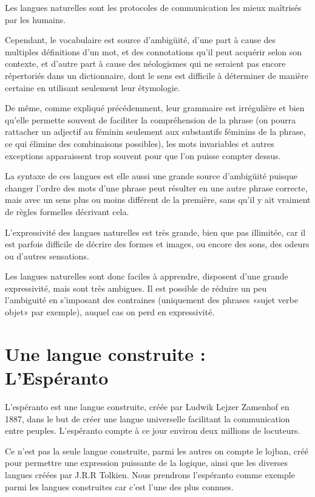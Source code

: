 \documentclass[french,a4paper]{article}
\begin{document}
Les langues naturelles sont les protocoles de communication les mieux
maîtrisés par les humains.

Cependant, le vocabulaire est source d'ambigüité, d'une part à cause
des multiples définitions d'un mot, et des connotations qu'il peut
acquérir selon son contexte, et d'autre part à cause des néologismes
qui ne seraient pas encore répertoriés dans un dictionnaire, dont le
sens est difficile à déterminer de manière certaine en utilisant
seulement leur étymologie.

De même, comme expliqué précédemment, leur grammaire est irrégulière
et bien qu'elle permette souvent de faciliter la compréhension de la
phrase (on pourra rattacher un adjectif au féminin seulement aux
substantifs féminins de la phrase, ce qui élimine des combinaisons
possibles), les mots invariables et autres exceptions apparaissent
trop souvent pour que l'on puisse compter dessus.

La syntaxe de ces langues est elle aussi une grande source d'ambigüité
puisque changer l'ordre des mots d'une phrase peut résulter en une
autre phrase correcte, mais avec un sens plus ou moins différent de la
première, sans qu'il y ait vraiment de règles formelles décrivant
cela.

L'expressivité des langues naturelles est très grande, bien que pas
illimitée, car il est parfois difficile de décrire des formes et
images, ou encore des sons, des odeurs ou d'autres sensations.

Les langues naturelles sont donc faciles à apprendre, disposent d'une
grande expressivité, mais sont très ambigues. Il est possible de
réduire un peu l'ambiguité en s'imposant des contraines (uniquement
des phrases «sujet verbe objet» par exemple), auquel cas on perd en
expressivité.


\section{Une langue construite : L'Espéranto}
L'espéranto est une langue construite, créée par Ludwik Lejzer
Zamenhof en 1887, dans le but de créer une langue universelle
facilitant la communication entre peuples. L'espéranto compte à ce
jour environ deux millions de locuteurs.

Ce n'est pas la seule langue construite, parmi les autres on compte le
lojban, créé pour permettre une expression puissante de la logique,
ainsi que les diverses langues créées par J.R.R Tolkien. Nous
prendrons l'espéranto comme exemple parmi les langues construites car
c'est l'une des plus connues.
\end{document}
